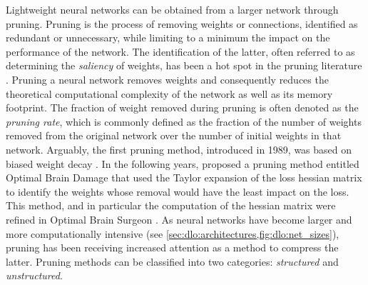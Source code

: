 Lightweight neural networks can be obtained from a larger network through
pruning. Pruning is the process of removing weights or connections, identified
as redundant or unnecessary, while limiting to a minimum the impact on the
performance of the network. The identification of the latter, often referred to
as determining the \emph{saliency} of weights, has been a hot spot in the
pruning literature \cite{li2023model,cheng2017survey,liang2021pruning}. Pruning
a neural network removes weights and consequently reduces the theoretical
computational complexity of the network as well as its memory footprint.  The
fraction of weight removed during pruning is often denoted as the \emph{pruning
rate}, which is commonly defined as the fraction of the number of weights
removed from the original network over the number of initial weights in that
network. Arguably, the first pruning method, introduced in 1989, was based on
biased weight decay \cite{hanson1988comparing}. In the following years,
\citeauthor{DBLP:conf/nips/CunDS89} proposed a pruning method entitled Optimal
Brain Damage \cite{DBLP:conf/nips/CunDS89} that used the Taylor expansion of the
loss hessian matrix to identify the weights whose removal would have the least
impact on the loss. This method, and in particular the computation of the
hessian matrix were refined in Optimal Brain Surgeon
\cite{DBLP:conf/nips/HassibiS92,DBLP:conf/nips/HassibiSW93,DBLP:conf/icnn/HassibiSW93}.
As neural networks have become larger and more computationally intensive (see
\cref{sec:dlo:architectures,fig:dlo:net_sizes}), pruning has been receiving
increased attention as a method to compress the latter. Pruning methods can be
classified into two categories: \emph{structured} and \emph{unstructured}.\\


